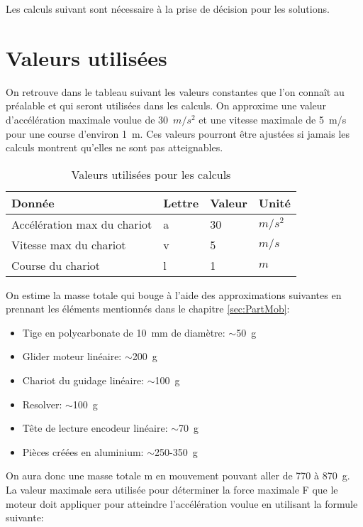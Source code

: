 Les calculs suivant sont nécessaire à la prise de décision pour les solutions.

\section{Valeurs utilisées}\label{sec:ValUtil}
On retrouve dans le tableau suivant les valeurs constantes que l'on connaît au préalable et qui seront utilisées dans les calculs.
On approxime une valeur d'accélération maximale voulue de 30~$m/s^2$ et une vitesse maximale de 5~m/s pour une course d'environ 1~m.
Ces valeurs pourront être ajustées si jamais les calculs montrent qu'elles ne sont pas atteignables.

\begin{table}[H]
    \centering
    \caption{Valeurs utilisées pour les calculs}
    \label{tab:ValUtil}
    \begin{tabular}{|l|l|l|l|}
        \hline
        \textbf{Donnée}             & \textbf{Lettre} & \textbf{Valeur} & \textbf{Unité} \\ \hline
        Accélération max du chariot & a               & 30              & $m/s^2$        \\ \hline
        Vitesse max du chariot      & v               & 5               & $m/s$          \\ \hline
        Course du chariot           & l               & 1               & $m$            \\ \hline
    \end{tabular}%
\end{table}

On estime la masse totale qui bouge à l'aide des approximations suivantes en prennant les éléments mentionnés dans le chapitre \ref{sec:PartMob}:
\begin{itemize}
    \item Tige en polycarbonate de 10~mm de diamètre: $\sim$50~g
    \item Glider moteur linéaire: $\sim$200~g
    \item Chariot du guidage linéaire: $\sim$100~g
    \item Resolver: $\sim$100~g
    \item Tête de lecture encodeur linéaire: $\sim$70~g
    \item Pièces créées en aluminium: $\sim$250-350~g
\end{itemize}

On aura donc une masse totale m en mouvement pouvant aller de 770 à 870~g. La valeur maximale sera utilisée pour déterminer la force maximale F
que le moteur doit appliquer pour atteindre l'accélération voulue en utilisant la formule suivante:


